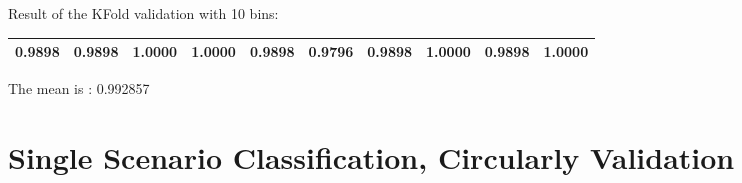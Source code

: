 Result of the KFold validation with 10 bins:
 {\def\arraystretch{1.3} 
 \begin{table}[H] 
\centering 
\begin{tabular}{|l |l |l |l |l |l |l |l |l |l |}  
\hline 
0.9898&
0.9898&
1.0000&
1.0000&
0.9898&
0.9796&
0.9898&
1.0000&
0.9898&
1.0000\\ \hline  

\end{tabular} 
\end{table} }

The mean is : 0.992857

\chapter{Single Scenario Classification, Circularly Validation}

